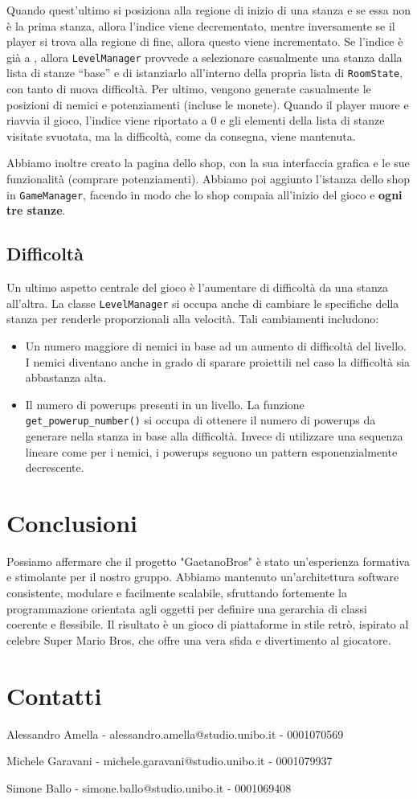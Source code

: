 \documentclass[a4paper,12pt]{article}
\begin{document}
Quando quest’ultimo si posiziona alla regione di inizio di una stanza e se essa non è la prima stanza, allora l’indice viene decrementato, mentre inversamente se il player si trova alla regione di fine, allora questo viene incrementato. Se l’indice è già a , allora \texttt{LevelManager} provvede a selezionare casualmente una stanza dalla lista di stanze “base” e di istanziarlo all’interno della propria lista di \texttt{RoomState}, con tanto di nuova difficoltà. Per ultimo, vengono generate casualmente le posizioni di nemici e potenziamenti (incluse le monete).
Quando il player muore e riavvia il gioco, l’indice viene riportato a 0 e gli elementi della lista di stanze visitate svuotata, ma la difficoltà, come da consegna, viene mantenuta.

Abbiamo inoltre creato la pagina dello shop, con la sua interfaccia grafica e le sue funzionalità (comprare potenziamenti). Abbiamo poi aggiunto l’istanza dello shop in \texttt{GameManager}, facendo in modo che lo shop compaia all’inizio del gioco e \textbf{ogni tre stanze}.

\subsection{Difficoltà}
Un ultimo aspetto centrale del gioco è l’aumentare di difficoltà da una stanza all’altra. La classe \texttt{LevelManager} si occupa anche di cambiare le specifiche della stanza per renderle proporzionali alla velocità.
Tali cambiamenti includono:
\begin{itemize}
\item Un numero maggiore di nemici in base ad un aumento di difficoltà del livello. I nemici diventano anche in grado di sparare proiettili nel caso la difficoltà sia abbastanza alta.
\item Il numero di powerups presenti in un livello. La funzione \texttt{get\_powerup\_number()} si occupa di ottenere il numero di powerups da generare nella stanza in base alla difficoltà. Invece di utilizzare una sequenza lineare come per i nemici, i powerups seguono un pattern esponenzialmente decrescente.
\end{itemize}

\section{Conclusioni}
Possiamo affermare che il progetto "GaetanoBros" è stato un’esperienza formativa e stimolante per il nostro gruppo. Abbiamo mantenuto un’architettura software consistente, modulare e facilmente scalabile, sfruttando fortemente la programmazione orientata agli oggetti per definire una gerarchia di classi coerente e flessibile. Il risultato è un gioco di piattaforme in stile retrò, ispirato al celebre Super Mario Bros, che offre una vera sfida e divertimento al giocatore.

\appendix
\section{Contatti}

\centering

Alessandro Amella - alessandro.amella@studio.unibo.it - 0001070569

Michele Garavani - michele.garavani@studio.unibo.it - 0001079937

Simone Ballo - simone.ballo@studio.unibo.it - 0001069408
\end{document}
